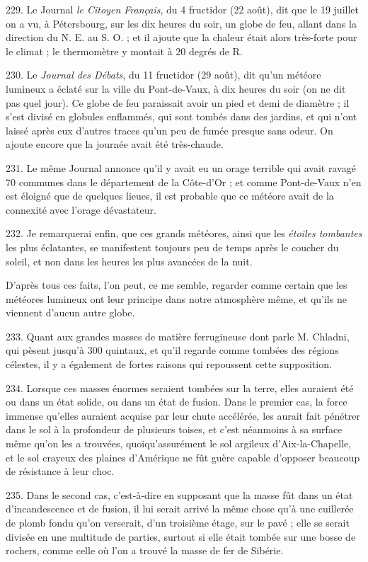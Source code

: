 \documentclass[a4paper, 11pt, oneside, polutonikogreek, french]{article}
\begin{document}
229. Le Journal \emph{le Citoyen Français}, du 4 fructidor (22 août), dit que le 19 juillet on a vu, à Pétersbourg, sur les dix heures du soir, un globe de feu, allant dans la direction du N. E. au S. O. ; et il ajoute que la chaleur était alors très-forte pour le climat ; le thermomètre y montait à 20 degrés de R.

230. Le \emph{Journal des Débats}, du 11 fructidor (29 août), dit qu'un météore lumineux a éclaté sur la ville du Pont-de-Vaux, à dix heures du soir (on ne dit pas quel jour). Ce globe de feu paraissait avoir un pied et demi de diamètre ; il s'est divisé en globules enflammés, qui sont tombés dans des jardins, et qui n'ont laissé après eux d'autres traces qu'un peu de fumée presque sans odeur. On ajoute encore que la journée avait été très-chaude.

231. Le même Journal annonce qu'il y avait eu un orage terrible qui avait ravagé 70 communes dans le département de la Côte-d'Or ; et comme Pont-de-Vaux n'en est éloigné que de quelques lieues, il est probable que ce météore avait de la connexité avec l'orage dévastateur.

232. Je remarquerai enfin, que ces grands météores, ainsi que les \emph{étoiles tombantes} les plus éclatantes, se manifestent toujours peu de temps après le coucher du soleil, et non dans les heures les plus avancées de la nuit.

D'après tous ces faits, l'on peut, ce me semble, regarder comme certain que les météores lumineux ont leur principe dans notre atmosphère même, et qu'ils ne viennent d'aucun autre globe.

233. Quant aux grandes masses de matière ferrugineuse dont parle M. Chladni, qui pèsent jusqu'à 300 quintaux, et qu'il regarde comme tombées des régions célestes, il y a également de fortes raisons qui repoussent cette supposition.

234. Lorsque ces masses énormes seraient tombées sur la terre, elles auraient été ou dans un état solide, ou dans un état de fusion. Dans le premier cas, la force immense qu'elles auraient acquise par leur chute accélérée, les aurait fait pénétrer dans le sol à la profondeur de plusieurs toises, et c'est néanmoins à sa surface même qu'on les a trouvées, quoiqu'assurément le sol argileux d'Aix-la-Chapelle, et le sol crayeux des plaines d'Amérique ne fût guère capable d'opposer beaucoup de résistance à leur choc.

235. Dans le second cas, c'est-à-dire en supposant que la masse fût dans un état d'incandescence et de fusion, il lui serait arrivé la même chose qu'à une cuillerée de plomb fondu qu'on verserait, d'un troisième étage, sur le pavé ; elle se serait divisée en une multitude de parties, surtout si elle était tombée sur une bosse de rochers, comme celle où l'on a trouvé la masse de fer de Sibérie.
\end{document}
